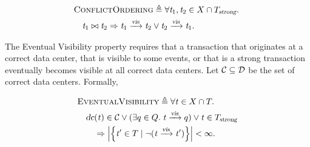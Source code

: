 \begin{appdefinition}[\conflictaxiom] \label{def:conflictaxiom}
  \begin{align*}
    &\conflictaxiom \triangleq
      \forall \tvar_{1}, \tvar_{2} \in X \cap \strongtxs.\; \\
        &\quad \tvar_{1} \conflict \tvar_{2} \implies
          \tvar_{1} \rel{\vis} \tvar_{2} \lor \tvar_{2} \rel{\vis} \tvar_{1}.
  \end{align*}
\end{appdefinition}
The Eventual Visibility property requires that
a transaction that originates at a correct data center,
that is visible to some \fence{} events,
or that is a strong transaction
eventually becomes visible at all correct data centers.
Let $\mathcal{C} \subseteq \mathcal{D}$ be the set of correct data centers.
Formally,
\begin{appdefinition}[\ev] \label{def:ev}
  \begin{align*}
    &\ev \triangleq \forall \tvar \in X \cap \txs.\; \\
      &\quad \dc(\tvar) \in \C \lor
        (\exists \fencerange \in \Fence.\; \tvar \rel{\vis} \fencerange) \lor \tvar \in \strongtxs \\
        &\qquad \implies \left\lvert \left\{\tvar' \in \txs
          \mid \lnot (\tvar \rel{\vis} \tvar') \right\} \right\rvert < \infty.
  \end{align*}
\end{appdefinition}
